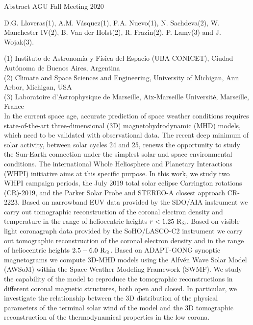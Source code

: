 \documentclass[]{article}
\begin{document}
\centerline{Abstract AGU Fall Meeting 2020}

\vskip 0.5cm

\vskip 0.5cm
\noindent
D.G. Lloveras(1), A.M. Vásquez(1), F.A. Nuevo(1), N. Sachdeva(2), W. Manchester IV(2), B. Van der Holst(2), R. Frazin(2), P. Lamy(3) and J. Wojak(3).

\vskip 0.5cm
\noindent
(1) Instituto de Astronomía y Física del Espacio (UBA-CONICET), Ciudad Autónoma de Buenos Aires, Argentina\\
(2) Climate and Space Sciences and Engineering, University of Michigan, Ann Arbor, Michigan, USA\\
(3) Laboratoire d’Astrophysique de Marseille, Aix-Marseille Université, Marseille, France\\


\vskip 0.5cm
\noindent
In the current space age, accurate prediction of space weather conditions requires state-of-the-art three-dimensional (3D) magnetohydrodynamic (MHD) models, which need to be validated with observational data. The recent deep minimum of solar activity, between solar cycles 24 and 25, renews the opportunity to study the Sun-Earth connection under the simplest solar and space environmental conditions. The international Whole Heliosphere and Planetary Interactions (WHPI) initiative aims at this specific purpose. In this work, we study two WHPI campaign periods, the July 2019 total solar eclipse Carrington rotations (CR)-2019, and the Parker Solar Probe and STEREO-A closest approach CR-2223. Based on narrowband EUV data provided by the SDO/AIA instrument we carry out tomographic reconstruction of the coronal electron density and temperature in the range of heliocentric heights $r < 1.25~{\rm R}_\odot$. Based on visible light coronagraph data provided by the SoHO/LASCO-C2 instrument we carry out tomographic reconstruction of the coronal electron density and in the range of heliocentric heights $2.5-6.0~{\rm R}_\odot$. Based on ADAPT-GONG synoptic magnetograms we compute 3D-MHD models using the Alfvén Wave Solar Model (AWSoM) within the Space Weather Modeling Framework (SWMF). We study the capability of the model to reproduce the tomographic reconstructions in different coronal magnetic structures, both open and closed. In particular, we investigate the relationship between the 3D distribution of the physical parameters of the terminal solar wind of the model and the 3D tomographic reconstruction of the thermodynamical properties in the low corona.
\end{document}

